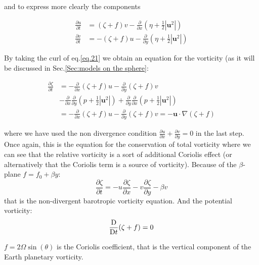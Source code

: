 and to express more clearly the components

\[\begin{aligned}
		\frac{\partial u}{\partial t} & = (\zeta +f) v -\frac{\partial }{\partial x}(\eta+\frac{1}{2}|\bm{u}^2|)  \\
		\frac{\partial v}{\partial t} & = -(\zeta +f) u -\frac{\partial }{\partial y}(\eta+\frac{1}{2}|\bm{u}^2|)
	\end{aligned}\]

By taking the curl of eq.\ref{eq.21} we obtain an equation for the vorticity (as it will be discussed in Sec.\ref{Sec:models on the sphere}:

\[\begin{aligned}
		\frac{\partial \zeta}{\partial t} & = -\frac{\partial }{\partial x}(\zeta +f) u -\frac{\partial }{\partial y}(\zeta +f) v                                                                                  \\
		                                  & -\frac{\partial }{\partial x} \frac{\partial }{\partial y}(p+\frac{1}{2}|\bm{u}^2|) +\frac{\partial }{\partial y}\frac{\partial }{\partial x}(p+\frac{1}{2}|\bm{u}^2|) \\
		                                  & =  -\frac{\partial }{\partial x}(\zeta +f) u -\frac{\partial }{\partial y}(\zeta +f) v = -\bm{u}\cdot\nabla(\zeta +f)
	\end{aligned}\]

where we have used the non divergence condition
\(\frac{\partial u}{\partial x}+\frac{\partial v}{\partial y}=0\) in the
last step. Once again, this is the equation for the conservation of
total vorticity where we can see that the relative vorticity is a sort
of additional Coriolis effect (or alternatively that the Coriolis term
is a source of vorticity). Because of the $\beta$-plane $f=f_0+\beta y$:
\begin{equation}\label{Barotropic equation}
	\frac{\partial\zeta}{\partial t}=-u\frac{\partial\zeta}{\partial x}-v\frac{\partial\zeta}{\partial y}-\beta v
\end{equation}
that is the non-divergent barotropic vorticity equation. And the potential vorticity:
\begin{equation}\label{eq.potential vorticity}
	\frac{\mathrm{D} }{\mathrm{D}t}(\zeta +f)=0
\end{equation}

\(f= 2\Omega \sin(\theta)\) is the Coriolis coefficient, that is the
vertical component of the Earth planetary vorticity.

